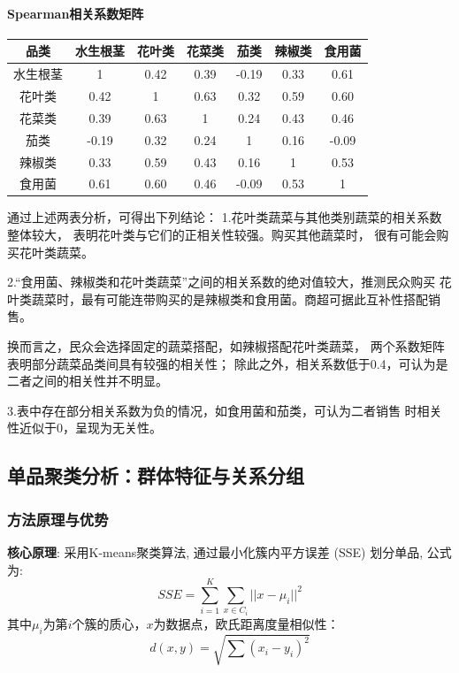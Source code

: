 \documentclass{cumcmthesis}
\begin{document}
\paragraph{Spearman相关系数矩阵}
\begin{table}[H]
\centering
\begin{tabular}{c c c c c c c}
\toprule
品类 & 水生根茎 & 花叶类 & 花菜类 & 茄类 & 辣椒类 & 食用菌 \\
\midrule
水生根茎 & 1 & 0.42 & 0.39 & -0.19 & 0.33 & 0.61 \\
花叶类 & 0.42 & 1 & 0.63 & 0.32 & 0.59 & 0.60 \\
花菜类 & 0.39 & 0.63 & 1 & 0.24 & 0.43 & 0.46 \\
茄类 & -0.19 & 0.32 & 0.24 & 1 & 0.16 & -0.09 \\
辣椒类 & 0.33 & 0.59 & 0.43 & 0.16 & 1 & 0.53 \\
食用菌 & 0.61 & 0.60 & 0.46 & -0.09 & 0.53 & 1 \\
\bottomrule
\end{tabular}
\end{table}

通过上述两表分析，可得出下列结论：
1.花叶类蔬菜与其他类别蔬菜的相关系数整体较大，
表明花叶类与它们的正相关性较强。购买其他蔬菜时，
很有可能会购买花叶类蔬菜。

2.“食用菌、辣椒类和花叶类蔬菜”之间的相关系数的绝对值较大，推测民众购买
花叶类蔬菜时，最有可能连带购买的是辣椒类和食用菌。商超可据此互补性搭配销售。

换而言之，民众会选择固定的蔬菜搭配，如辣椒搭配花叶类蔬菜，
两个系数矩阵表明部分蔬菜品类间具有较强的相关性；
除此之外，相关系数低于0.4，可认为是二者之间的相关性并不明显。

3.表中存在部分相关系数为负的情况，如食用菌和茄类，可认为二者销售
时相关性近似于0，呈现为无关性。

\subsection{单品聚类分析：群体特征与关系分组}
\subsubsection{方法原理与优势}

\textbf{核心原理}: 采用K-means聚类算法, 通过最小化簇内平方误差 (SSE) 划分单品, 公式为: 
\begin{equation}
SSE=\sum_{i=1}^{K}\sum_{x\in C_i}||x-\mu_i||^2
\end{equation}  
其中$\mu_i$为第$i$个簇的质心，$x$为数据点，欧氏距离度量相似性：  
\begin{equation}
d(x,y)=\sqrt{\sum (x_i-y_i)^2}
\end{equation}
\end{document}
